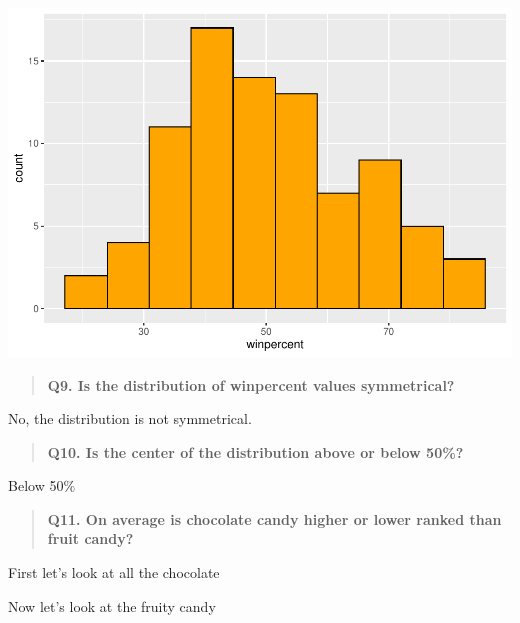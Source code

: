 \documentclass[
]{article}
\newenvironment{Shaded}{\begin{snugshade}}{\end{snugshade}}
\newcommand{\FunctionTok}[1]{\textcolor[rgb]{0.00,0.00,0.00}{#1}}
\newcommand{\NormalTok}[1]{#1}
\newcommand{\OtherTok}[1]{\textcolor[rgb]{0.56,0.35,0.01}{#1}}
\newcommand{\SpecialCharTok}[1]{\textcolor[rgb]{0.00,0.00,0.00}{#1}}
\begin{document}
\includegraphics{Class-10-Halloween-Candy_files/figure-latex/unnamed-chunk-8-2.pdf}

\begin{quote}
\textbf{Q9. Is the distribution of winpercent values symmetrical?}
\end{quote}

No, the distribution is not symmetrical.

\begin{quote}
\textbf{Q10. Is the center of the distribution above or below 50\%?}
\end{quote}

Below 50\%

\begin{quote}
\textbf{Q11. On average is chocolate candy higher or lower ranked than
fruit candy?}
\end{quote}

First let's look at all the chocolate

\begin{Shaded}
\end{Shaded}

Now let's look at the fruity candy

\begin{Shaded}
\end{Shaded}
\end{document}
